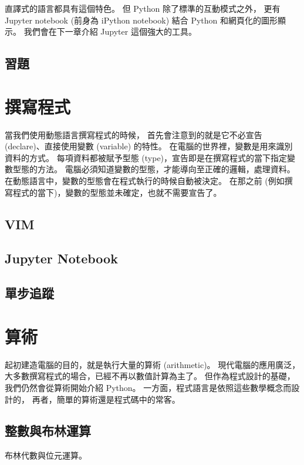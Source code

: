 \documentclass[a4paper,12pt]{book}
\theoremstyle{definition}
\begin{document}
直譯式的語言都具有這個特色。
但 Python 除了標準的互動模式之外，
更有 Jupyter notebook (前身為 iPython notebook) 結合 Python 和網頁化的圖形顯示。
我們會在下一章介紹 Jupyter 這個強大的工具。

\section{習題}

\chapter{撰寫程式}
%
\label{c:write}

當我們使用動態語言撰寫程式的時候，
首先會注意到的就是它不必宣告 (declare)、直接使用變數 (variable) 的特性。
在電腦的世界裡，變數是用來識別資料的方式。
每項資料都被賦予型態 (type)，宣告即是在撰寫程式的當下指定變數型態的方法。
電腦必須知道變數的型態，才能導向至正確的邏輯，處理資料。
在動態語言中，變數的型態會在程式執行的時候自動被決定。
在那之前 (例如撰寫程式的當下)，變數的型態並未確定，也就不需要宣告了。

\section{VIM}

\section{Jupyter Notebook}

\section{單步追蹤}

\chapter{算術}
%
\label{c:arithmetic}

起初建造電腦的目的，就是執行大量的算術 (arithmetic)。
現代電腦的應用廣泛，大多數撰寫程式的場合，已經不再以數值計算為主了。
但作為程式設計的基礎，我們仍然會從算術開始介紹 Python。
一方面，程式語言是依照這些數學概念而設計的，
再者，簡單的算術還是程式碼中的常客。

\section{整數與布林運算}

布林代數與位元運算。
\end{document}
